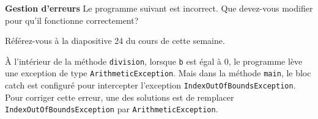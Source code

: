 \begin{Exercice}[5 minutes] [Java] \textbf{Gestion d'erreurs} 
    Le programme suivant est incorrect. Que devez-vous modifier pour qu'il fonctionne correctement?
    \\
    \begin{conseil}
        Référez-vous à la diapositive 24 du cours de cette semaine.           
     \end{conseil}
    
     
     \begin{solution}
        À l'intérieur de la méthode \lstinline{division}, lorsque \lstinline{b} est égal à 0, le programme lève une exception de type \lstinline{ArithmeticException}. Mais dans la méthode \lstinline{main}, le bloc catch est configuré pour intercepter l'exception \lstinline{IndexOutOfBoundsException}. Pour corriger cette erreur, une des solutions est de remplacer \lstinline{IndexOutOfBoundsException} par \lstinline{ArithmeticException}.
     \end{solution}   
 \end{Exercice}

